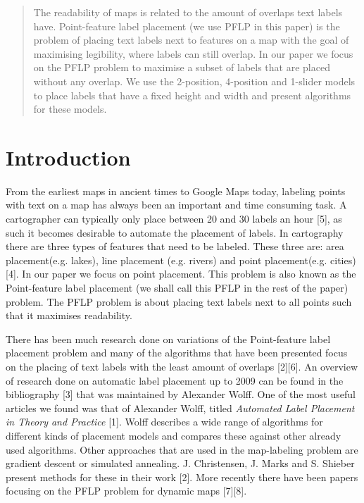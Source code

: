 \documentclass[crop=false,a4paper,oneside,11pt]{standalone}
\begin{document}
\begin{abstract}
The readability of maps is related to the amount of overlaps text labels have. Point-feature label placement (we use PFLP in this paper) is the problem of placing text labels next to features on a map with the goal of maximising legibility, where labels can still overlap. In our paper we focus on the PFLP problem to maximise a subset of labels that are placed without any overlap. We use the 2-position, 4-position and 1-slider models to place labels that have a fixed height and width and present algorithms for these models.
\end{abstract}

\section{Introduction}
From the earliest maps in ancient times to Google Maps today, labeling points with text on a map has always been an important and time consuming task. A cartographer can typically only place between 20 and 30 labels an hour [5], as such it becomes desirable to automate the placement of labels. In cartography there are three types of features that need to be labeled. These three are: area placement(e.g. lakes), line placement (e.g. rivers) and point placement(e.g. cities) [4]. In our paper we focus on point placement. This problem is also known as the Point-feature label placement (we shall call this PFLP in the rest of the paper) problem. The PFLP problem is about placing text labels next to all points such that it maximises readability.

 There has been much research done on variations of the Point-feature label placement problem and many of the algorithms that have been presented focus on the placing of text labels with the least amount of overlaps [2][6]. An overview of research done on automatic label placement up to 2009 can be found in the bibliography [3] that was maintained by Alexander Wolff. One of the most useful articles we found was that of Alexander Wolff, titled \emph{Automated Label Placement in Theory and Practice} [1]. Wolff describes a wide range of algorithms for different kinds of placement models and compares these against other already used algorithms. Other approaches that are used in the map-labeling problem are gradient descent or simulated annealing. J. Christensen, J. Marks and S. Shieber present methods for these in their work [2]. More recently there have been papers focusing on the PFLP problem for dynamic maps [7][8].
\end{document}
